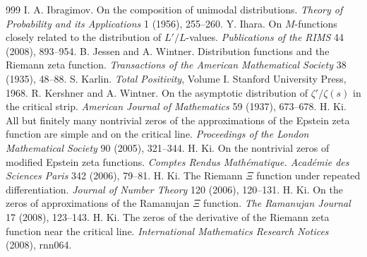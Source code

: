 \begin{thebibliography}{999}
 I. A. Ibragimov. On the composition of unimodal distributions. \emph{Theory of Probability and its Applications} 1 (1956), 255--260.
 Y. Ihara. On $M$-functions closely related to the distribution of $L'/L$-values. \emph{Publications of the RIMS} 44 (2008), 893--954.
 B. Jessen and A. Wintner. Distribution functions and the Riemann zeta function. \emph{Transactions of the American Mathematical Society} 38 (1935), 48--88.
 S. Karlin. \emph{Total Positivity}, Volume I. Stanford University Press, 1968.
 R. Kershner and A. Wintner. On the asymptotic distribution of $\zeta'/\zeta(s)$ in the critical strip. \emph{American Journal of Mathematics} 59 (1937), 673--678.
 H. Ki. All but finitely many nontrivial zeros of the approximations of the Epstein zeta function are simple and on the critical line. \emph{Proceedings of the London Mathematical Society} 90 (2005), 321--344.
 H. Ki. On the nontrivial zeros of modified Epstein zeta functions. \emph{Comptes Rendus Math\'ematique. Acad\'emie des Sciences Paris} 342 (2006), 79--81.
 H. Ki. The Riemann $\Xi$ function under repeated differentiation. \emph{Journal of Number Theory} 120 (2006), 120--131.
 H. Ki. On the zeros of approximations of the Ramanujan $\Xi$ function. \emph{The Ramanujan Journal} 17 (2008), 123--143.
 H. Ki. The zeros of the derivative of the Riemann zeta function near the critical line. \emph{International Mathematics Research Notices} (2008), rnn064.

\end{thebibliography}
